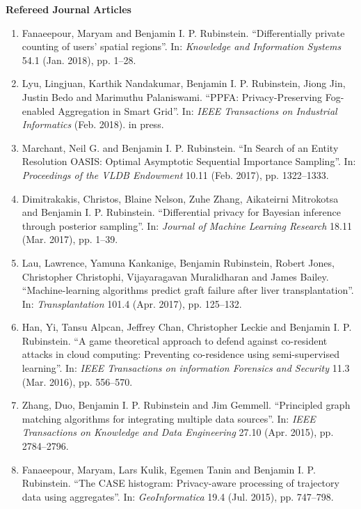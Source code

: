 \documentclass[a4paper,12pt]{article}
\begin{document}
\noindent\textbf{Refereed Journal Articles}

\begin{enumerate}
\setcounter{enumi}{\value{list}}

\item Fanaeepour, Maryam and Benjamin I. P. Rubinstein.
``Differentially private counting of users' spatial regions''.
In: \emph{Knowledge and Information Systems} 54.1 (Jan. 2018), pp. 1--28.

\item Lyu, Lingjuan, Karthik Nandakumar, Benjamin I. P. Rubinstein, Jiong Jin, Justin Bedo and Marimuthu Palaniswami.
``PPFA: Privacy-Preserving Fog-enabled Aggregation in Smart Grid''.
In: \emph{IEEE Transactions on Industrial Informatics} (Feb. 2018). in press.

\item Marchant, Neil G. and Benjamin I. P. Rubinstein.
``In Search of an Entity Resolution OASIS: Optimal Asymptotic Sequential Importance Sampling''.
In: \emph{Proceedings of the VLDB Endowment} 10.11 (Feb. 2017), pp. 1322--1333.

\item Dimitrakakis, Christos, Blaine Nelson, Zuhe Zhang, Aikateirni Mitrokotsa and Benjamin I. P. Rubinstein.
``Differential privacy for Bayesian inference through posterior sampling''.
In: \emph{Journal of Machine Learning Research} 18.11 (Mar. 2017), pp. 1--39.

\item Lau, Lawrence, Yamuna Kankanige, Benjamin Rubinstein, Robert Jones, Christopher Christophi, Vijayaragavan Muralidharan and James Bailey.
``Machine-learning algorithms predict graft failure after liver transplantation''.
In: \emph{Transplantation} 101.4 (Apr. 2017), pp. 125--132.

\item Han, Yi, Tansu Alpcan, Jeffrey Chan, Christopher Leckie and Benjamin I. P. Rubinstein.
``A game theoretical approach to defend against co-resident attacks in cloud computing: Preventing co-residence using semi-supervised learning''.
In: \emph{IEEE Transactions on information Forensics and Security} 11.3 (Mar. 2016), pp. 556--570.

\item Zhang, Duo, Benjamin I. P. Rubinstein and Jim Gemmell.
``Principled graph matching algorithms for integrating multiple data sources''.
In: \emph{IEEE Transactions on Knowledge and Data Engineering} 27.10 (Apr. 2015), pp. 2784--2796.

\item Fanaeepour, Maryam, Lars Kulik, Egemen Tanin and Benjamin I. P. Rubinstein.
``The CASE histogram: Privacy-aware processing of trajectory data using aggregates''.
In: \emph{GeoInformatica} 19.4 (Jul. 2015), pp. 747--798.


\end{enumerate}
\end{document}
